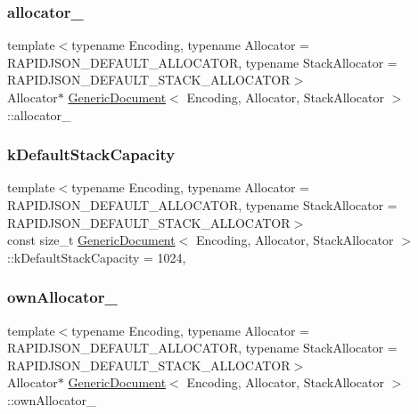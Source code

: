 \subsubsection{\texorpdfstring{allocator\+\_\+}{allocator\_}}
{\footnotesize\ttfamily template$<$typename Encoding, typename Allocator = R\+A\+P\+I\+D\+J\+S\+O\+N\+\_\+\+D\+E\+F\+A\+U\+L\+T\+\_\+\+A\+L\+L\+O\+C\+A\+T\+OR, typename Stack\+Allocator = R\+A\+P\+I\+D\+J\+S\+O\+N\+\_\+\+D\+E\+F\+A\+U\+L\+T\+\_\+\+S\+T\+A\+C\+K\+\_\+\+A\+L\+L\+O\+C\+A\+T\+OR$>$ \\
Allocator$\ast$ \hyperlink{classGenericDocument}{Generic\+Document}$<$ Encoding, Allocator, Stack\+Allocator $>$\+::allocator\+\_\+\hspace{0.3cm}{\ttfamily [private]}}

\mbox{\label{classGenericDocument_a90d452abe8940d8a9c9634d1c49d8f49}} 
\subsubsection{\texorpdfstring{k\+Default\+Stack\+Capacity}{kDefaultStackCapacity}}
{\footnotesize\ttfamily template$<$typename Encoding, typename Allocator = R\+A\+P\+I\+D\+J\+S\+O\+N\+\_\+\+D\+E\+F\+A\+U\+L\+T\+\_\+\+A\+L\+L\+O\+C\+A\+T\+OR, typename Stack\+Allocator = R\+A\+P\+I\+D\+J\+S\+O\+N\+\_\+\+D\+E\+F\+A\+U\+L\+T\+\_\+\+S\+T\+A\+C\+K\+\_\+\+A\+L\+L\+O\+C\+A\+T\+OR$>$ \\
const size\+\_\+t \hyperlink{classGenericDocument}{Generic\+Document}$<$ Encoding, Allocator, Stack\+Allocator $>$\+::k\+Default\+Stack\+Capacity = 1024\hspace{0.3cm}{\ttfamily [static]}, {\ttfamily [private]}}

\mbox{\label{classGenericDocument_ada153f6865201106b3a753861c870266}} 
\subsubsection{\texorpdfstring{own\+Allocator\+\_\+}{ownAllocator\_}}
{\footnotesize\ttfamily template$<$typename Encoding, typename Allocator = R\+A\+P\+I\+D\+J\+S\+O\+N\+\_\+\+D\+E\+F\+A\+U\+L\+T\+\_\+\+A\+L\+L\+O\+C\+A\+T\+OR, typename Stack\+Allocator = R\+A\+P\+I\+D\+J\+S\+O\+N\+\_\+\+D\+E\+F\+A\+U\+L\+T\+\_\+\+S\+T\+A\+C\+K\+\_\+\+A\+L\+L\+O\+C\+A\+T\+OR$>$ \\
Allocator$\ast$ \hyperlink{classGenericDocument}{Generic\+Document}$<$ Encoding, Allocator, Stack\+Allocator $>$\+::own\+Allocator\+\_\+\hspace{0.3cm}{\ttfamily [private]}}

